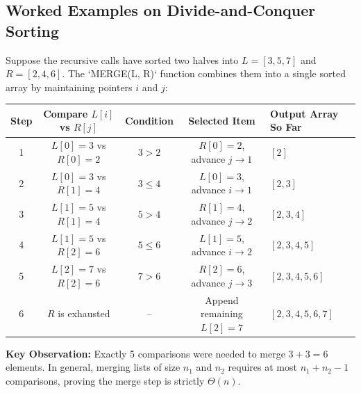 \documentclass[11pt,a4paper]{article}
\begin{document}
\subsection{Worked Examples on Divide-and-Conquer Sorting}

\begin{examplebox}
Suppose the recursive calls have sorted two halves into $L = [3, 5, 7]$ and $R = [2, 4, 6]$. The `MERGE(L, R)` function combines them into a single sorted array by maintaining pointers $i$ and $j$:
\begin{center}
\begin{tabular}{c c c c l}
\toprule
\textbf{Step} & \textbf{Compare $L[i]$ vs $R[j]$} & \textbf{Condition} & \textbf{Selected Item} & \textbf{Output Array So Far} \\
\midrule
1 & $L[0]=3$ vs $R[0]=2$ & $3 > 2$ & $R[0]=2$, advance $j \to 1$ & $[2]$ \\
2 & $L[0]=3$ vs $R[1]=4$ & $3 \le 4$ & $L[0]=3$, advance $i \to 1$ & $[2, 3]$ \\
3 & $L[1]=5$ vs $R[1]=4$ & $5 > 4$ & $R[1]=4$, advance $j \to 2$ & $[2, 3, 4]$ \\
4 & $L[1]=5$ vs $R[2]=6$ & $5 \le 6$ & $L[1]=5$, advance $i \to 2$ & $[2, 3, 4, 5]$ \\
5 & $L[2]=7$ vs $R[2]=6$ & $7 > 6$ & $R[2]=6$, advance $j \to 3$ & $[2, 3, 4, 5, 6]$ \\
6 & $R$ is exhausted & -- & Append remaining $L[2]=7$ & $[2, 3, 4, 5, 6, 7]$ \\
\bottomrule
\end{tabular}
\end{center}
\textbf{Key Observation:} Exactly 5 comparisons were needed to merge $3 + 3 = 6$ elements. In general, merging lists of size $n_1$ and $n_2$ requires at most $n_1 + n_2 - 1$ comparisons, proving the merge step is strictly $\Theta(n)$.
\end{examplebox}
\end{document}
